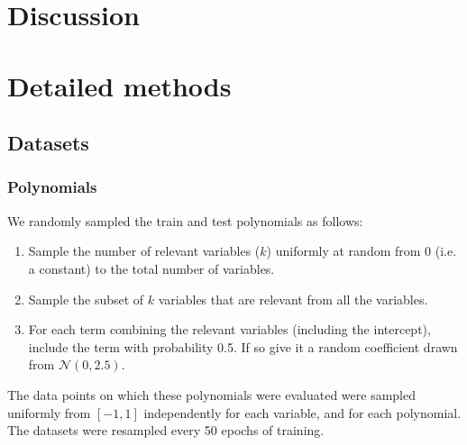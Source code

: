 \documentclass{article}
\begin{document}
\section{Discussion}




\newpage
\appendix

\section{Detailed methods}
\subsection{Datasets}
\subsubsection{Polynomials} \label{meth_data_poly}
We randomly sampled the train and test polynomials as follows:
\begin{enumerate}
\item Sample the number of relevant variables ($k$) uniformly at random from 0 (i.e. a constant) to the total number of variables.
\item Sample the subset of $k$ variables that are relevant from all the variables.
\item For each term combining the relevant variables (including the intercept), include the term with probability 0.5. If so give it a random coefficient drawn from $\mathcal{N}(0, 2.5)$.
\end{enumerate}
The data points on which these polynomials were evaluated were sampled uniformly from $[-1, 1]$ independently for each variable, and for each polynomial. The datasets were resampled every 50 epochs of training. \par
\end{document}
